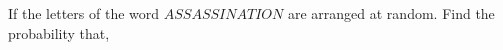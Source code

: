 

\question If the letters of the word $ASSASSINATION$ are arranged at 
random. Find the probability that,

\watchout


